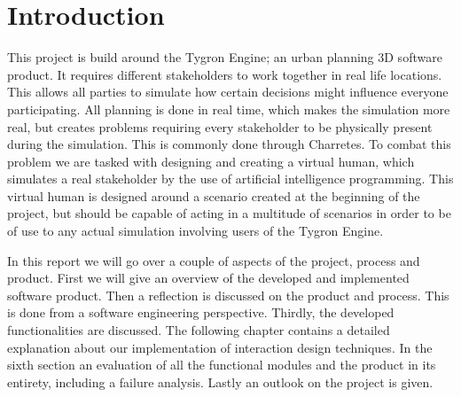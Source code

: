 \section{Introduction}

This project is build around the Tygron Engine; an urban planning 3D software product. It requires different stakeholders to work together in real life locations. This allows all parties to simulate how certain decisions might influence everyone participating. All planning is done in real time, which makes the simulation more real, but creates problems requiring every stakeholder to be physically present during the simulation. This is commonly done through Charretes\cite{Todd13}. To combat this problem we are tasked with designing and creating a virtual human, which simulates a real stakeholder by the use of artificial intelligence programming. This virtual human is designed around a scenario created at the beginning of the project, but should be capable of acting in a multitude of scenarios in order to be of use to any actual simulation involving users of the Tygron Engine.

In this report we will go over a couple of aspects of the project, process and product.\newline
First we will give an overview of the developed and implemented software product. Then a reflection is discussed on the product and process. This is done from a software engineering perspective. Thirdly, the developed functionalities are discussed. The following chapter contains a detailed explanation about our implementation of interaction design techniques. In the sixth section an evaluation of all the functional modules and the product in its entirety, including a failure analysis. Lastly an outlook on the project is given.
\newpage
